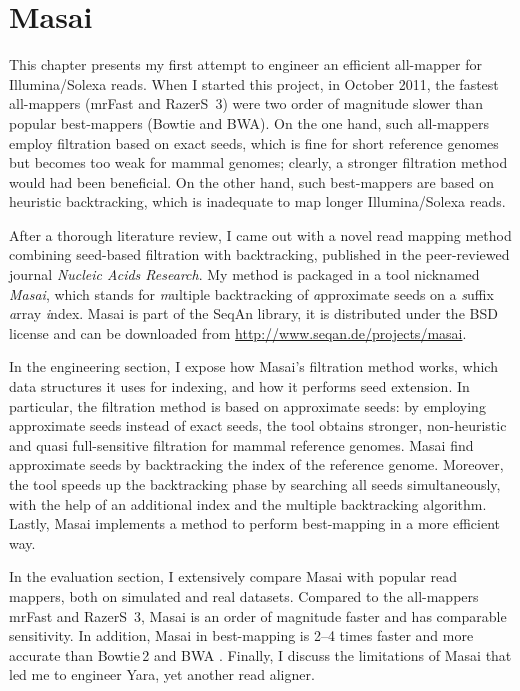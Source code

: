 \chapter{Masai}
\label{sec:masai}

This chapter presents my first attempt to engineer an efficient all-mapper for Illumina/Solexa reads.
When I started this project, in October 2011, the fastest all-mappers (mrFast and RazerS~3) were two order of magnitude slower than popular best-mappers (Bowtie and BWA).
On the one hand, such all-mappers employ filtration based on exact seeds, which is fine for short reference genomes but becomes too weak for mammal genomes; clearly, a stronger filtration method would had been beneficial.
On the other hand, such best-mappers are based on heuristic backtracking, which is inadequate to map longer Illumina/Solexa reads.

After a thorough literature review, I came out with a novel read mapping method combining seed-based filtration with backtracking, published \citep{Siragusa2013} in the peer-reviewed journal \emph{Nucleic Acids Research}.
My method is packaged in a \CC tool nicknamed \emph{Masai}, which stands for \emph{m}ultiple backtracking of \emph{a}pproximate seeds on a \emph{s}uffix \emph{a}rray \emph{i}ndex.
Masai is part of the SeqAn library, it is distributed under the BSD license and can be downloaded from \url{http://www.seqan.de/projects/masai}.

In the engineering section, I expose how Masai's filtration method works, which data structures it uses for indexing, and how it performs seed extension.
In particular, the filtration method is based on approximate seeds: by employing approximate seeds instead of exact seeds, the tool obtains stronger, non-heuristic and quasi full-sensitive filtration for mammal reference genomes.
Masai find approximate seeds by backtracking the index of the reference genome.
Moreover, the tool speeds up the backtracking phase by searching all seeds simultaneously, with the help of an additional index and the multiple backtracking algorithm.
Lastly, Masai implements a method to perform best-mapping in a more efficient way.

In the evaluation section, I extensively compare Masai with popular read mappers, both on simulated and real datasets.
Compared to the all-mappers mrFast and RazerS~3, Masai is an order of magnitude faster and has comparable sensitivity.
In addition, Masai in best-mapping is 2--4 times faster and more accurate than Bowtie\,2 \citep{Langmead2012} and BWA \citep{Li2009}.
Finally, I discuss the limitations of Masai that led me to engineer Yara, yet another read aligner.

